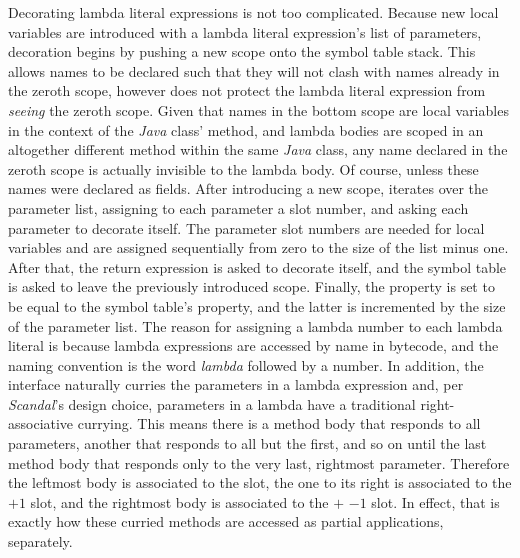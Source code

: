Decorating lambda literal expressions is not too complicated. Because new local variables are introduced with a lambda literal expression's list of parameters, decoration begins by pushing a new scope onto the symbol table stack. This allows names to be declared such that they will not clash with names already in the zeroth scope, however does not protect the lambda literal expression from \emph{seeing} the zeroth scope. Given that names in the bottom scope are local variables in the context of the \emph{Java} class'  method, and lambda bodies are scoped in an altogether different method within the same \emph{Java} class, any name declared in the zeroth scope is actually invisible to the lambda body. Of course, unless these names were declared as fields. After introducing a new scope,  iterates over the parameter list, assigning to each parameter a slot number, and asking each parameter to decorate itself. The parameter slot numbers are needed for local variables and are assigned sequentially from zero to the size of the list minus one. After that, the return expression is asked to decorate itself, and the symbol table is asked to leave the previously introduced scope. Finally, the  property is set to be equal to the symbol table's  property, and the latter is incremented by the size of the parameter list. The reason for assigning a lambda number to each lambda literal is because lambda expressions are accessed by name in bytecode, and the naming convention is the word \emph{lambda} followed by a number. In addition, the  interface naturally curries the parameters in a lambda expression and, per \emph{Scandal}'s design choice, parameters in a lambda have a traditional right-associative currying. This means there is a method body that responds to all parameters, another that responds to all but the first, and so on until the last method body that responds only to the very last, rightmost parameter. Therefore the leftmost body is associated to the  slot, the one to its right is associated to the $ + 1$ slot, and the rightmost body is associated to the  $+$ $ - 1$ slot. In effect, that is exactly how these curried methods are accessed as partial applications, separately.

